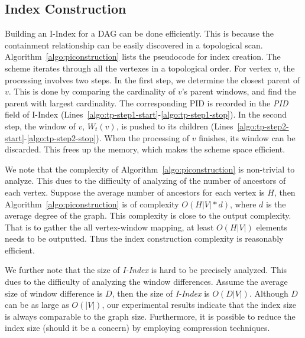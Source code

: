 \subsection{Index Construction} 
Building an I-Index for a DAG
can be done efficiently. 
This is because the containment relationship can be easily 
discovered in a topological scan.
Algorithm~\ref{algo:piconstruction} lists the pseudocode for 
index creation. 
The scheme iterates through all the vertexes in a topological order.
For vertex $v$, the processing involves two steps.
In the first step, we determine the closest parent
of $v$. This is done by comparing the cardinality of $v$'s parent windows,
and find the parent with largest cardinality. 
The corresponding PID is recorded in the \emph{PID} field of 
I-Index (Lines~\ref{algo:tp-step1-start}-\ref{algo:tp-step1-stop}). 
In the second step, the window of $v$, $W_t(v)$, is pushed to 
its children (Lines~\ref{algo:tp-step2-start}-\ref{algo:tp-step2-stop}). 
When the processing of $v$ finishes, its window can be discarded. This
frees up the memory, which makes the scheme space efficient.

We note that the complexity of Algorithm~\ref{algo:piconstruction} is non-trivial to analyze. 
This dues to the difficulty of analyzing of the number of ancestors of each vertex. Suppose the 
average number of ancestors for each vertex is $H$, then Algorithm~\ref{algo:piconstruction} is of
complexity $O(H|V|*d)$, where $d$ is the average degree of the graph. This complexity is close to the
output complexity. That is to gather the all vertex-window mapping, at least $O(H|V|)$ elements needs
to be outputted. Thus the index construction complexity is reasonably efficient.

We further note that the size of \emph{I-Index} is hard to be precisely analyzed. 
This dues to the difficulty of analyzing the window differences.
Assume the average size of window difference
is $D$, then the size of \emph{I-Index} is $O(D|V|)$. Although $D$ can be as large as $O(|V|)$, our 
experimental results indicate that the index size is always 
comparable to the graph size. Furthermore, it is possible to
reduce the index size (should it be a concern) by employing
compression techniques. 

